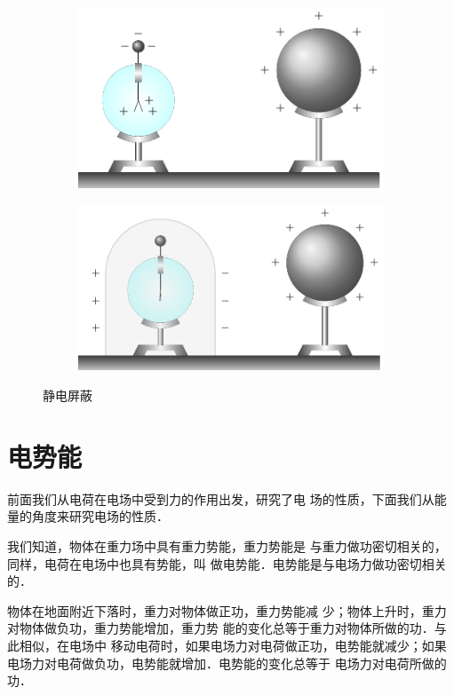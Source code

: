 \begin{figure}[htbp]
    \centering
    \begin{subfigure}{0.4\linewidth}
        \centering
        \includegraphics{fig/B/6-15a.pdf}
        \caption{}\label{fig_B_6-15a}
    \end{subfigure}
    \hfil
    \begin{subfigure}{0.4\linewidth}
        \centering
        \includegraphics{fig/B/6-15b.pdf}
        \caption{}\label{fig_B_6-15b}
    \end{subfigure}
    \caption{静电屏蔽}\label{fig_B_6-15}
\end{figure}


\section{电势能}
前面我们从电荷在电场中受到力的作用出发，研究了电
场的性质，下面我们从能量的角度来研究电场的性质．

我们知道，物体在重力场中具有重力势能，重力势能是
与重力做功密切相关的，同样，电荷在电场中也具有势能，叫
做电势能．电势能是与电场力做功密切相关的．

物体在地面附近下落时，重力对物体做正功，重力势能减
少；物体上升时，重力对物体做负功，重力势能增加，重力势
能的变化总等于重力对物体所做的功．与此相似，在电场中
移动电荷时，如果电场力对电荷做正功，电势能就减少；如果
电场力对电荷做负功，电势能就增加．电势能的变化总等于
电场力对电荷所做的功．

